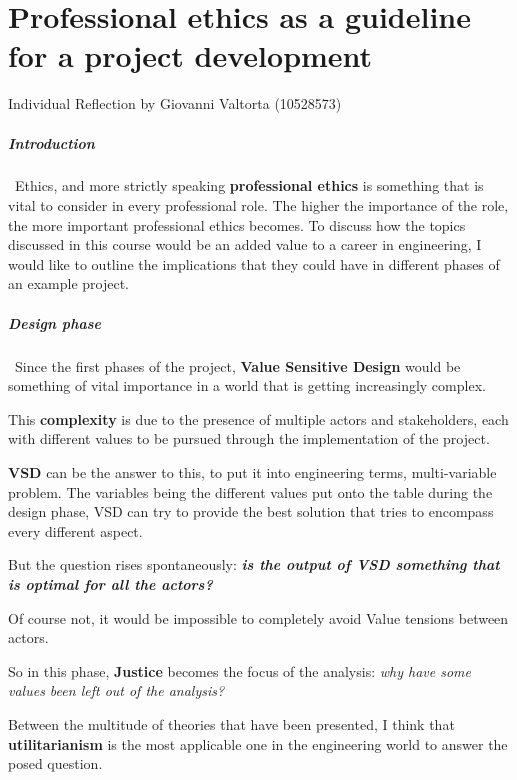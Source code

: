 \chapter{Professional ethics as a guideline for a project development}

\begin{flushright}
Individual Reflection by Giovanni Valtorta (10528573)
\end{flushright}

\paragraph{Introduction}\
Ethics, and more strictly speaking \textbf{professional ethics} is something that is vital to consider in every professional role. The higher the importance of the role, the more important professional ethics becomes.
To discuss how the topics discussed in this course would be an added value to a career in engineering, I would like to outline the implications that they could have in different phases of an example project. 

\paragraph{Design phase}\
Since the first phases of the project, \textbf{Value Sensitive Design} \cite{Watkins2021UsingSystem} would be something of vital importance in a world that is getting increasingly complex. 

This \textbf{complexity} is due to the presence of multiple actors and stakeholders, each with different values to be pursued through the implementation of the project. 

\textbf{VSD} can be the answer to this, to put it into engineering terms, multi-variable problem. The variables being the different values put onto the table during the design phase, VSD can try to provide the best solution that tries to encompass every different aspect. 

But the question rises spontaneously: \textit{\textbf{is the output of VSD something that is optimal for all the actors? }}

Of course not, it would be impossible to completely avoid Value tensions between actors. 

So in this phase,  \textbf{Justice} becomes the focus of the analysis: \textit{why have some values been left out of the analysis? }

Between the multitude of theories that have been presented, I think that \textbf{utilitarianism} \cite{Pereira2017DistributiveTransportation}is the most applicable one in the engineering world to answer the posed question. 

